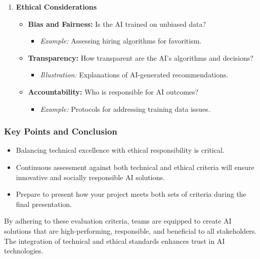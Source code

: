 \documentclass[aspectratio=169]{beamer}
\begin{document}
\begin{frame}[fragile]
\begin{enumerate}
        \item \textbf{Ethical Considerations}
            \begin{itemize}
                \item \textbf{Bias and Fairness:} Is the AI trained on unbiased data?
                    \begin{itemize}
                        \item \textit{Example:} Assessing hiring algorithms for favoritism.
                    \end{itemize}
                \item \textbf{Transparency:} How transparent are the AI’s algorithms and decisions?
                    \begin{itemize}
                        \item \textit{Illustration:} Explanations of AI-generated recommendations.
                    \end{itemize}
                \item \textbf{Accountability:} Who is responsible for AI outcomes?
                    \begin{itemize}
                        \item \textit{Example:} Protocols for addressing training data issues.
                    \end{itemize}
            \end{itemize}
    \end{enumerate}
\end{frame}

\begin{frame}[fragile]
    \frametitle{Key Points and Conclusion}
    \begin{itemize}
        \item Balancing technical excellence with ethical responsibility is critical.
        \item Continuous assessment against both technical and ethical criteria will ensure innovative and socially responsible AI solutions.
        \item Prepare to present how your project meets both sets of criteria during the final presentation.
    \end{itemize}
        
    By adhering to these evaluation criteria, teams are equipped to create AI solutions that are high-performing, responsible, and beneficial to all stakeholders. 
    The integration of technical and ethical standards enhances trust in AI technologies.
\end{frame}
\end{document}
